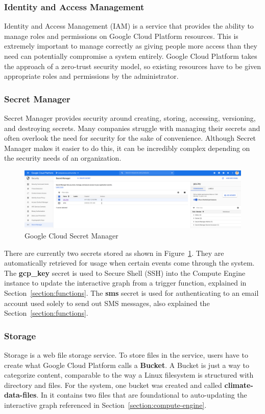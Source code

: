 \documentclass{article}
\begin{document}
\subsubsection{Identity and Access Management}
Identity and Access Management (IAM) is a service that provides the ability to manage roles and permissions on Google Cloud Platform resources. This is extremely important to manage correctly as giving people more access than they need can potentially compromise a system entirely. Google Cloud Platform takes the approach of a zero-trust security model, so existing resources have to be given appropriate roles and permissions by the administrator.

\subsubsection{Secret Manager}
Secret Manager provides security around creating, storing, accessing, versioning, and destroying secrets. Many companies struggle with managing their secrets and often overlook the need for security for the sake of convenience. Although Secret Manager makes it easier to do this, it can be incredibly complex depending on the security needs of an organization.

\begin{figure}[H]
	\center
	\includegraphics[width=\textwidth]{images/secret-manager.png}
	\caption{Google Cloud Secret Manager}
	\label{fig:secret-manager}
\end{figure}

There are currently two secrets stored as shown in Figure~\ref{fig:secret-manager}. They are automatically retrieved for usage when certain events come through the system. The \textbf{gcp\_key} secret is used to Secure Shell (SSH) into the Compute Engine instance to update the interactive graph from a trigger function, explained in Section~\ref{section:functions}. The \textbf{sms} secret is used for authenticating to an email account used solely to send out SMS messages, also explained the Section~\ref{section:functions}.

\subsubsection{Storage}
Storage is a web file storage service. To store files in the service, users have to create what Google Cloud Platform calls a \textbf{Bucket}. A Bucket is just a way to categorize content, comparable to the way a Linux filesystem is structured with directory and files. For the system, one bucket was created and called \textbf{climate-data-files}. In it contains two files that are foundational to auto-updating the interactive graph referenced in Section~\ref{section:compute-engine}.
\end{document}
